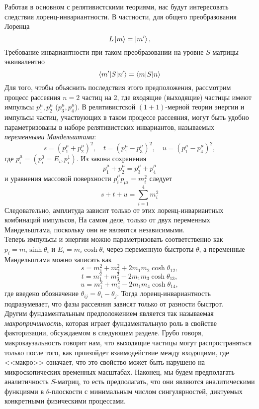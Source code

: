 \documentclass[12pt]{article}
\theoremstyle{definition}
\begin{document}
Работая в основном с релятивистскими теориями, нас будут интересовать следствия лоренц-инвариантности. В частности, для общего преобразования Лоренца
\begin{equation}
    L\ket{m}=\ket{m'},
\end{equation}
Требование инвариантности при таком преобразовании на уровне $S$-матрицы эквивалентно
\begin{equation}
    \braket{m'|S|n'}=\braket{m|S|n}
\end{equation}
Для того, чтобы объяснить последствия этого предположения, рассмотрим процесс рассеяния $n=2$ частиц на 2, где входящие (выходящие) частицы имеют импульсы $p^\mu_1,p^\mu_2$ ($p^\mu_3,p^\mu_4$). В релятивистской $(1+1)$-мерной теории энергии и импульсы частиц, участвующих в таком процессе рассеяния, могут быть удобно параметризованы в наборе релятивистских инвариантов, называемых \textit{переменными Мандельштама}:
\begin{equation}
    s=(p^\mu_1+p^\mu_2)^2,\quad t=(p^\mu_1-p^\mu_3)^2,\quad u=(p^\mu_1-p^\mu_4)^2,
\end{equation}
где $p^\mu_i=(p^0_i=E_i,p^1_i)$. Из закона сохранения 
\begin{equation}
    p^\mu_1+p^\mu_2=p^\mu_3+p^\mu_4
\end{equation}
и уравнения массовой поверхности $p^\mu_ip_{\mu i}=m_i^2$ следует
\begin{equation}
    s+t+u=\sum\limits_{i=1}^4m_i^2
\end{equation}
Следовательно, амплитуда зависит только от этих лоренц-инвариантных комбинаций импульсов, На самом деле, только от двух переменных Мандельштама, поскольку они не являются независимыми.\\
Теперь импульсы и энергии можно параметризовать соответственно как $p_i=m_i\sinh\theta_i$ и $E_i=m_i\cosh\theta_i$ через переменную быстроты $\theta$, а переменные Мандельштама можно записать как
\begin{equation}
    s=m_1^2+m_2^2+2m_1m_2\cosh\theta_{12},
\end{equation}
\begin{equation}
    t=m_1^2+m_3^2-2m_1m_3\cosh\theta_{13},
\end{equation}
\begin{equation}
    u=m_1^2+m_4^2-2m_1m_4\cosh\theta_{14},
\end{equation}
где введено обозначение $\theta_{ij}=\theta_i-\theta_j$. Тогда лоренц-инвариантность подразумевает, что фазы рассеяния зависят только от разности быстрот.\\
Другим фундаментальным предположением является так называемая \textit{макропричинность}, которая играет фундаментальную роль в свойстве факторизации, обсуждаемом в следующем разделе. Грубо говоря, макрокаузальность говорит нам, что выходящие частицы могут распространяться только после того, как произойдет взаимодействие между входящими, где <<макро>> означает, что это свойство может быть нарушено на микроскопических временных масштабах. Наконец, мы будем предполагать аналитичность $S$-матриц, то есть предполагать, что они являются аналитическими функциями в $\theta$-плоскости с минимальным числом сингулярностей, диктуемых конкретными физическими процессами.
\end{document}
